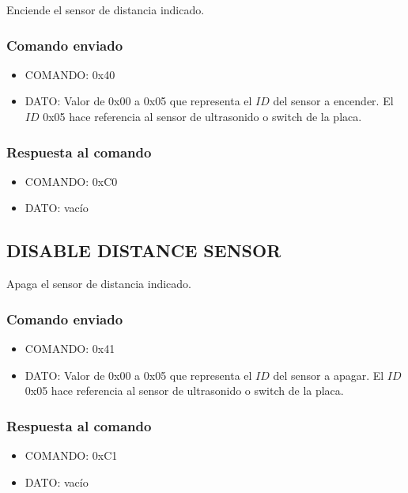 \documentclass[a4paper,10pt]{article}
\begin{document}
Enciende el sensor de distancia indicado.

\subsubsection*{Comando enviado}

\begin{itemize}
	\item{COMANDO:} 0x40
	\item{DATO:} Valor de 0x00 a 0x05 que representa el $ID$ del sensor a encender.
	El $ID$ 0x05 hace referencia al sensor de ultrasonido o switch de la placa.
\end{itemize}

\subsubsection*{Respuesta al comando}

\begin{itemize}
	\item{COMANDO:} 0xC0
	\item{DATO:} vac\'io
\end{itemize}

\subsection{DISABLE DISTANCE SENSOR}
\label{disable_distance_sensor}

Apaga el sensor de distancia indicado.

\subsubsection*{Comando enviado}

\begin{itemize}
	\item{COMANDO:} 0x41
	\item{DATO:} Valor de 0x00 a 0x05 que representa el $ID$ del sensor a apagar.
	El $ID$ 0x05 hace referencia al sensor de ultrasonido o switch de la placa.
\end{itemize}

\subsubsection*{Respuesta al comando}

\begin{itemize}
	\item{COMANDO:} 0xC1
	\item{DATO:} vac\'io
\end{itemize}
\end{document}
